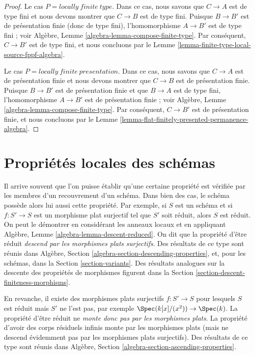 \begin{proof}
\medskip\noindent
Le cas $P = locally\ finite\ type$. Dans ce cas, nous savons que
$C \to A$ est de type fini et nous devons montrer que $C \to B$ est de
type fini. Puisque $B \to B'$ est de présentation finie (donc de type
fini), l'homomorphisme $A \to B'$ est de type fini ; voir Algèbre,
Lemme \ref{algebra-lemma-compose-finite-type}. Par conséquent,
$C \to B'$ est de type fini, et nous concluons par le
Lemme \ref{lemma-finite-type-local-source-fppf-algebra}.

\medskip\noindent
Le cas $P = locally\ finite\ presentation$. Dans ce cas, nous savons
que $C \to A$ est de présentation finie et nous devons montrer que
$C \to B$ est de présentation finie. Puisque $B \to B'$ est de
présentation finie et que $B \to A$ est de type fini, l'homomorphisme
$A \to B'$ est de présentation finie ; voir Algèbre,
Lemme \ref{algebra-lemma-compose-finite-type}. Par conséquent,
$C \to B'$ est de présentation finie, et nous concluons par le
Lemme \ref{lemma-flat-finitely-presented-permanence-algebra}.
\end{proof}










\section{Propriétés locales des schémas}
\label{section-descending-properties}

\noindent
Il arrive souvent que l'on puisse établir qu'une certaine propriété est
vérifiée par les membres d'un recouvrement d'un schéma. Dans bien des cas,
le schéma possède alors lui aussi cette propriété. Par exemple, si $S$ est
un schéma et si $f : S' \to S$ est un morphisme plat surjectif tel que $S'$
soit réduit, alors $S$ est réduit. On peut le démontrer en considérant les
anneaux locaux et en appliquant Algèbre, Lemme
\ref{algebra-lemma-descent-reduced}. On dit que la propriété d'être réduit
{\it descend par les morphismes plats surjectifs}. Des résultats de ce type
sont réunis dans Algèbre, Section
\ref{algebra-section-descending-properties}, et, pour les schémas, dans la
Section \ref{section-variants}. Des résultats analogues sur la descente des
propriétés de morphismes figurent dans la
Section \ref{section-descent-finiteness-morphisms}.

\medskip\noindent
En revanche, il existe des morphismes plats surjectifs $f : S' \to S$ pour
lesquels $S$ est réduit mais $S'$ ne l'est pas, par exemple
$\Spec(k[x]/(x^2)) \to \Spec(k)$. La propriété d'être réduit ne
{\it monte donc pas par les morphismes plats}. La propriété d'avoir des
corps résiduels infinis monte par les morphismes plats (mais ne descend
évidemment pas par les morphismes plats surjectifs). Des résultats de ce
type sont réunis dans Algèbre, Section
\ref{algebra-section-ascending-properties}.

